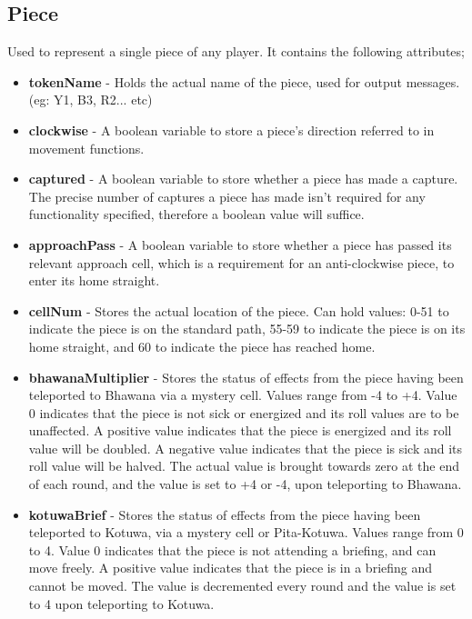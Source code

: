 \documentclass{article}
\begin{document}
\subsection{Piece}
Used to represent a single piece of any player.
It contains the following attributes;
\begin{itemize}
    \item \textbf{tokenName} - Holds the actual name of the piece, used for output messages. (eg: Y1, B3, R2... etc)
    \item \textbf{clockwise} - A boolean variable to store a piece's direction referred to in movement functions.
    \item \textbf{captured} - A boolean variable to store whether a piece has made a capture. The precise number of captures a piece has made isn't required for any functionality specified, therefore a boolean value will suffice.
    \item \textbf{approachPass} - A boolean variable to store whether a piece has passed its relevant approach cell, which is a requirement for an anti-clockwise piece, to enter its home straight.
    \item \textbf{cellNum} - Stores the actual location of the piece. Can hold values: 0-51 to indicate the piece is on the standard path, 55-59 to indicate the piece is on its home straight, and 60 to indicate the piece has reached home.
    \item \textbf{bhawanaMultiplier} - Stores the status of effects from the piece having been teleported to Bhawana via a mystery cell. Values range from -4 to +4. Value 0 indicates that the piece is not sick or energized and its roll values are to be unaffected. A positive value indicates that the piece is energized and its roll value will be doubled. A negative value indicates that the piece is sick and its roll value will be halved. The actual value is brought towards zero at the end of each round, and the value is set to +4 or -4, upon teleporting to Bhawana.
    \item \textbf{kotuwaBrief} - Stores the status of effects from the piece having been teleported to Kotuwa, via a mystery cell or Pita-Kotuwa. Values range from 0 to 4. Value 0 indicates that the piece is not attending a briefing, and can move freely. A positive value indicates that the piece is in a briefing and cannot be moved. The value is decremented every round and the value is set to 4 upon teleporting to Kotuwa.
\end{itemize}
\end{document}
